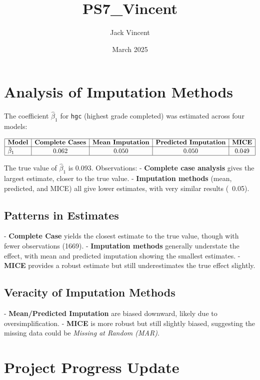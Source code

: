 \documentclass{article}
\title{PS7_Vincent}
\author{Jack Vincent}
\date{March 2025}
\begin{document}
\maketitle

\section*{Analysis of Imputation Methods}

The coefficient $\hat{\beta}_1$ for \texttt{hgc} (highest grade completed) was estimated across four models:

\[
\begin{array}{|l|c|c|c|c|}
\hline
\textbf{Model} & \textbf{Complete Cases} & \textbf{Mean Imputation} & \textbf{Predicted Imputation} & \textbf{MICE} \\
\hline
\hat{\beta}_1 & 0.062 & 0.050 & 0.050 & 0.049 \\
\hline
\end{array}
\]

The true value of $\hat{\beta}_1$ is 0.093. Observations:
- \textbf{Complete case analysis} gives the largest estimate, closer to the true value.
- \textbf{Imputation methods} (mean, predicted, and MICE) all give lower estimates, with very similar results (~0.05).

\subsection*{Patterns in Estimates}
- \textbf{Complete Case} yields the closest estimate to the true value, though with fewer observations (1669).
- \textbf{Imputation methods} generally understate the effect, with mean and predicted imputation showing the smallest estimates.
- \textbf{MICE} provides a robust estimate but still underestimates the true effect slightly.

\subsection*{Veracity of Imputation Methods}
- \textbf{Mean/Predicted Imputation} are biased downward, likely due to oversimplification.
- \textbf{MICE} is more robust but still slightly biased, suggesting the missing data could be \textit{Missing at Random (MAR)}.

\section*{Project Progress Update}
\end{document}
